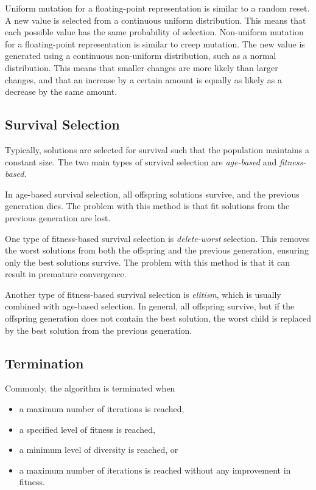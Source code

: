 Uniform mutation for a floating-point representation is similar to a random reset.
A new value is selected from a continuous uniform distribution.
This means that each possible value has the same probability of selection.
Non-uniform mutation for a floating-point representation is similar to creep mutation.
The new value is generated using a continuous non-uniform distribution, such as a normal distribution.
This means that smaller changes are more likely than larger changes, and that an increase by a certain amount is equally as likely as a decrease by the same amount.

\subsection{Survival Selection}

Typically, solutions are selected for survival such that the population maintains a constant size.
The two main types of survival selection are \emph{age-based} and \emph{fitness-based}.

In age-based survival selection, all offspring solutions survive, and the previous generation dies.
The problem with this method is that fit solutions from the previous generation are lost.

One type of fitness-based survival selection is \emph{delete-worst} selection.
This removes the worst solutions from both the offspring and the previous generation, ensuring only the best solutions survive.
The problem with this method is that it can result in premature convergence.

Another type of fitness-based survival selection is \emph{elitism}, which is usually combined with age-based selection.
In general, all offspring survive, but if the offspring generation does not contain the best solution, the worst child is replaced by the best solution from the previous generation.

\subsection{Termination}

Commonly, the algorithm is terminated when
\begin{itemize}
  \item a maximum number of iterations is reached,
  \item a specified level of fitness is reached,
  \item a minimum level of diversity is reached, or
  \item a maximum number of iterations is reached without any improvement in fitness.
\end{itemize}

